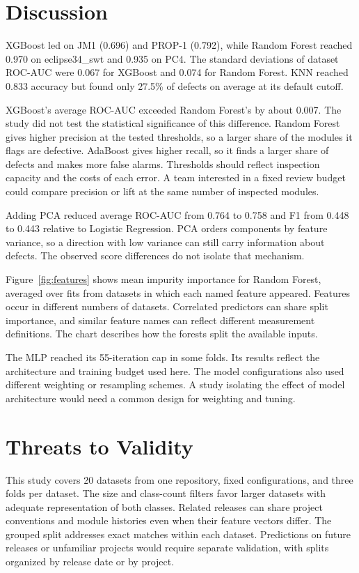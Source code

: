 \documentclass[conference]{IEEEtran}
\begin{document}
\section{Discussion}
XGBoost led on JM1 (0.696) and PROP-1 (0.792), while Random Forest reached 0.970 on eclipse34\_swt and 0.935 on PC4. The standard deviations of dataset ROC-AUC were 0.067 for XGBoost and 0.074 for Random Forest. KNN reached 0.833 accuracy but found only 27.5\% of defects on average at its default cutoff.

XGBoost's average ROC-AUC exceeded Random Forest's by about 0.007. The study did not test the statistical significance of this difference. Random Forest gives higher precision at the tested thresholds, so a larger share of the modules it flags are defective. AdaBoost gives higher recall, so it finds a larger share of defects and makes more false alarms. Thresholds should reflect inspection capacity and the costs of each error. A team interested in a fixed review budget could compare precision or lift at the same number of inspected modules.

Adding PCA reduced average ROC-AUC from 0.764 to 0.758 and F1 from 0.448 to 0.443 relative to Logistic Regression. PCA orders components by feature variance, so a direction with low variance can still carry information about defects. The observed score differences do not isolate that mechanism.

Figure~\ref{fig:features} shows mean impurity importance for Random Forest, averaged over fits from datasets in which each named feature appeared. Features occur in different numbers of datasets. Correlated predictors can share split importance, and similar feature names can reflect different measurement definitions. The chart describes how the forests split the available inputs.

The MLP reached its 55-iteration cap in some folds. Its results reflect the architecture and training budget used here. The model configurations also used different weighting or resampling schemes. A study isolating the effect of model architecture would need a common design for weighting and tuning.
\section{Threats to Validity}
This study covers 20 datasets from one repository, fixed configurations, and three folds per dataset. The size and class-count filters favor larger datasets with adequate representation of both classes. Related releases can share project conventions and module histories even when their feature vectors differ. The grouped split addresses exact matches within each dataset. Predictions on future releases or unfamiliar projects would require separate validation, with splits organized by release date or by project.
\end{document}
